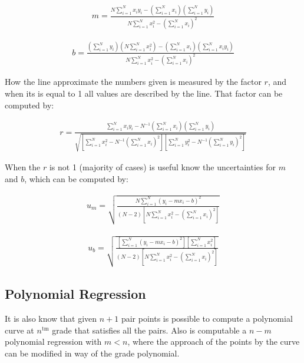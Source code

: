 \begin{align}
m = \frac{N\displaystyle\sum_{i=1}^{N}x_iy_i - \left(\sum_{i=1}^N x_i\right)\left(\sum_{i=1}^N y_i\right)}{N\displaystyle\sum_{i=1}^N x^2_i - \left(\sum_{i=1}^N x_i\right)^2}
\end{align}

\begin{align}
b = \frac{\left(\displaystyle\sum_{i=1}^N y_i\right)\left(N\displaystyle\sum_{i=1}^N x^2_i\right) -
\left(\displaystyle\sum_{i=1}^N x_i\right)\left(\displaystyle\sum_{i=1}^N x_i y_i\right)}{N\displaystyle\sum_{i=1}^N x^2_i - \left(\sum_{i=1}^N x_i\right)^2}
\end{align}

How the line approximate the numbers given is measured by the factor $r$, and when its is equal to
1 all values are described by the line. That factor can be computed by:

\begin{align}
r = \frac{\displaystyle\sum_{i=1}^N x_iy_i - N^{-1}\left(\displaystyle\sum_{i=1}^N x_i\right)\left(\displaystyle\sum_{i=1}^N y_i\right)}{\sqrt{\left[\displaystyle\sum_{i=1}^N x^2_i - N^{-1}\left(\displaystyle\sum_{i=1}^N x_i\right)^2\right]\left[\displaystyle\sum_{i=1}^N y^2_i - N^{-1}\left(\displaystyle\sum_{i=1}^N y_i\right)^2\right]}}
\end{align}

When the $r$ is not 1 (majority of cases) is useful know the uncertainties for $m$ and $b$, which can
be computed by:
\small

\begin{align}
u_m = \sqrt{\frac{N\displaystyle\sum_{i=1}^N (y_i -mx_i -b)^2}{(N-2)\left[N\displaystyle\sum_{i=1}^N x^2_i - \left(\sum_{i=1}^N x_i\right)^2\right]}}
\end{align}

\begin{align}
u_b = \sqrt{\frac{\left[\displaystyle\sum_{i=1}^N (y_i -mx_i -b)^2\right]\left[\displaystyle\sum_{i=1}^N x_i^2\right]}{(N-2)\left[N\displaystyle\sum_{i=1}^N x^2_i - \left(\displaystyle\sum_{i=1}^N x_i\right)^2\right]}}
\end{align}

\normalsize
\subsection{Polynomial Regression}

It is also know that given $n+1$ pair points is possible to compute a polynomial curve at $n^{\mathrm{tm}}$ grade that
satisfies all the pairs. Also is computable a $n-m$ polynomial regression with $m<n$, where the approach of the points
by the curve can be modified in way of the grade polynomial.

